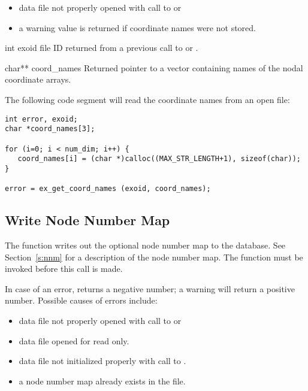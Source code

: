 \begin{itemize}
 \item data file not properly opened with call to 
 or 

 \item a warning value is returned if coordinate names were not
 stored.
\end{itemize}


\begin{parameters}
\item[{int exoid \R{}}]
\exo{} file ID returned from a previous call to  or
.

\item[{char** coord_names \W{}}]
Returned pointer to a vector containing  names of the nodal
coordinate arrays.
\end{parameters}

The following code segment will read the coordinate names from an open
\exo{} file:

\begin{lstlisting}
int error, exoid;
char *coord_names[3];

for (i=0; i < num_dim; i++) {
   coord_names[i] = (char *)calloc((MAX_STR_LENGTH+1), sizeof(char));
}

error = ex_get_coord_names (exoid, coord_names);
\end{lstlisting}


\subsection{Write Node Number Map}

The function  writes out the optional
node number map to the database. See Section~\ref{s:nnm} for a
description of the node number map. The function 
must be invoked before this call is made.

In case of an error,  returns a
negative number; a warning will return a positive number. Possible
causes of errors include:

\begin{itemize}
 \item data file not properly opened with call to 
 or 

 \item data file opened for read only.

 \item data file not initialized properly with call to .

 \item a node number map already exists in the file.
\end{itemize}


